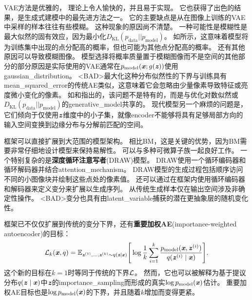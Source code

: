 \gls{VAE}方法是优雅的， 理论上令人愉快的，并且易于实现。
它也获得了出色的结果，是生成式建模中的最先进方法之一。
它的主要缺点是从在图像上训练的\gls{VAE}中采样的样本往往有些模糊。
这种现象的原因尚不清楚。
一种可能性是模糊性是最大似然的固有效应，因为最小化$D_{\text{KL}}(p_{\text{data}} ||p_{\text{model}} )$。
如所示，这意味着模型将为训练集中出现的点分配高的概率，但也可能为其他点分配高的概率。
还有其他原因可以导致模糊图像。
模型选择将概率质量置于模糊图像而不是空间的其他部分的部分原因是实际使用的\gls{VAE}通常在$p_{\text{model}}(\boldsymbol{\mathit{x}}; g(\boldsymbol{\mathit{z}}))$使用\gls{gaussian_distribution}。
<BAD>最大化这种分布似然性的下界与训练具有\gls{mean_squared_error}的传统\gls{AE}类似，这意味着它会忽略由少量像素导致特征或亮度微小变化的像素。
如\citet{Theis2015d}和\citet{Huszar-arXiv2015}指出的，该问题不是特有的，而是与优化对数似然或$D_{\text{KL}}(p_{\text{data}} ||p_{\text{model}} )$的\gls{generative_model}共享的。
现代模型另一个麻烦的问题是，它们倾向于仅使用$\boldsymbol{\mathit{z}}$维度中的小子集，就像\gls{encoder}不能够将具有足够局部方向的输入空间变换到边缘分布与分解前匹配的空间。


框架可以直接扩展到大范围的模型架构。
相比\gls{BM}，这是关键的优势，因为\gls{BM}需要非常仔细地设计模型来保持易解性。
可以与多种可微算子族一起良好工作。
一个特别复杂的是\textbf{深度循环注意写者}(DRAW)模型\citep{Gregor2015}。
DRAW使用一个循环编码器和循环解码器并结合\gls{attention_mechanism}。
DRAW模型的生成过程包括顺序访问不同的小图像块并绘制这些点处的像素值。
还可以通过在框架内使用循环编码器和解码器来定义变分\citep{Chung-et-al-NIPS2015}来扩展以生成序列。
从传统生成样本仅在输出空间涉及非确定性操作。
<BAD>变分也具有由\gls{latent_variable}捕获的潜在更抽象层的随机变化性。


框架已不仅仅扩展到传统的变分下界，还有\textbf{重要加权\gls{AE}}(importance-weighted autoencoder)\citep{burda2015importance}的目标：
\begin{align}
 \mathcal{L}_k(\boldsymbol{\mathit{x}}, q) = \mathbb{E}_{\boldsymbol{\mathit{z}}^{(1)},\dots,\boldsymbol{\mathit{z}}^{(k)} \sim q(\boldsymbol{\mathit{z}}  \mid  \boldsymbol{\mathit{x}})}
 \Bigg[ \log \frac{1}{k} \sum_{i=1}^k 
 \frac{p_{\text{model}}(\boldsymbol{\mathit{x}}, \boldsymbol{\mathit{z}}^{(i)})}{q(\boldsymbol{\mathit{z}}^{(i)}  \mid  \boldsymbol{\mathit{x}})} \Bigg].
\end{align}
这个新的目标在$k=1$时等同于传统的下界$\mathcal{L}$。
然而，它也可以被解释为基于提议分布$q(\boldsymbol{\mathit{z}}  \mid  \boldsymbol{\mathit{x}})$中$\boldsymbol{\mathit{z}}$的\gls{importance_sampling}而形成的真实$\log p_{\text{model}}(\boldsymbol{\mathit{x}})$估计。
重要加权\gls{AE}目标也是$\log p_{\text{model}}(\boldsymbol{\mathit{x}})$的下界，并且随着$k$增加而变得更紧。


